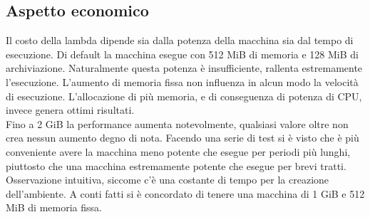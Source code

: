 \documentclass[12pt]{article}
\begin{document}
\subsection{Aspetto economico}
Il costo della lambda dipende sia dalla potenza della macchina sia dal 
tempo di esecuzione. 
Di default la macchina esegue con 512 MiB di memoria e 128 MiB di archiviazione. 
Naturalmente questa potenza è insufficiente, rallenta estremamente l'esecuzione. 
L'aumento di memoria fissa non influenza in alcun modo la velocità di esecuzione. 
L'allocazione di più memoria, e di conseguenza di potenza di CPU, invece 
genera ottimi risultati. 
\\ Fino a 2 GiB la performance aumenta notevolmente, qualsiasi valore oltre non 
crea nessun aumento degno di nota. 
Facendo una serie di test si è visto che è più conveniente avere la macchina 
meno potente che esegue per periodi più lunghi, piuttosto che una macchina 
estremamente potente che esegue per brevi tratti.
Osservazione intuitiva, siccome c'è una costante di tempo per la creazione 
dell'ambiente. 
A conti fatti si è concordato di tenere una macchina di 1 GiB e 512 MiB di 
memoria fissa. 

\thispagestyle{empty}
\newpage 

\end{document}
